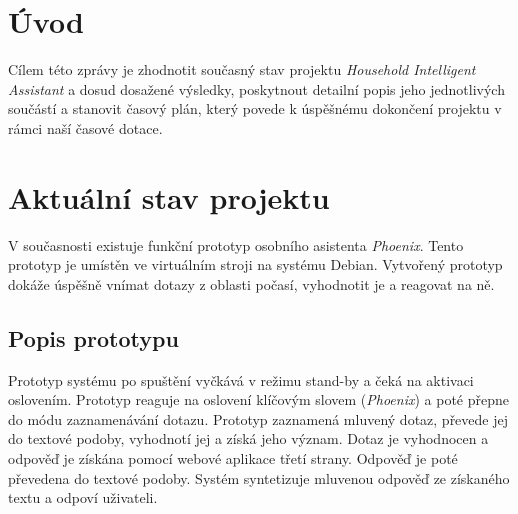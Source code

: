 \documentclass[12pt,a4paper]{article}
\begin{document}
\newpage
\pagestyle{plain}     %
\setcounter{page}{1}
\addtolength{\voffset}{-3cm}
\addtolength{\headheight}{2cm}

\pagestyle{fancy}
\lfoot{}
\cfoot{\thepage}
\rfoot{}
\renewcommand{\headrulewidth}{0.4pt}

\section*{Úvod}
Cílem této zprávy je zhodnotit současný stav projektu \textit{Household Intelligent Assistant} a dosud dosažené výsledky, poskytnout detailní popis jeho jednotlivých součástí a stanovit časový plán, který povede k úspěšnému dokončení projektu v rámci naší časové dotace.
\section*{Aktuální stav projektu}
V současnosti existuje funkční prototyp osobního asistenta \textit{Phoenix}. Tento prototyp je umístěn ve virtuálním stroji na systému Debian. Vytvořený prototyp dokáže úspěšně vnímat dotazy z oblasti počasí, vyhodnotit je a reagovat na ně. 

\subsection*{Popis prototypu}
Prototyp systému po spuštění vyčkává v režimu stand-by a čeká na aktivaci oslovením. Prototyp reaguje na oslovení klíčovým slovem (\textit{Phoenix}) a poté přepne do módu zaznamenávání dotazu. Prototyp zaznamená mluvený dotaz, převede jej do textové podoby, vyhodnotí jej a získá jeho význam. Dotaz je vyhodnocen a odpověď je získána pomocí webové aplikace třetí strany. Odpověď je poté převedena do textové podoby. Systém syntetizuje mluvenou odpověď ze získaného textu a odpoví uživateli.
\end{document}
